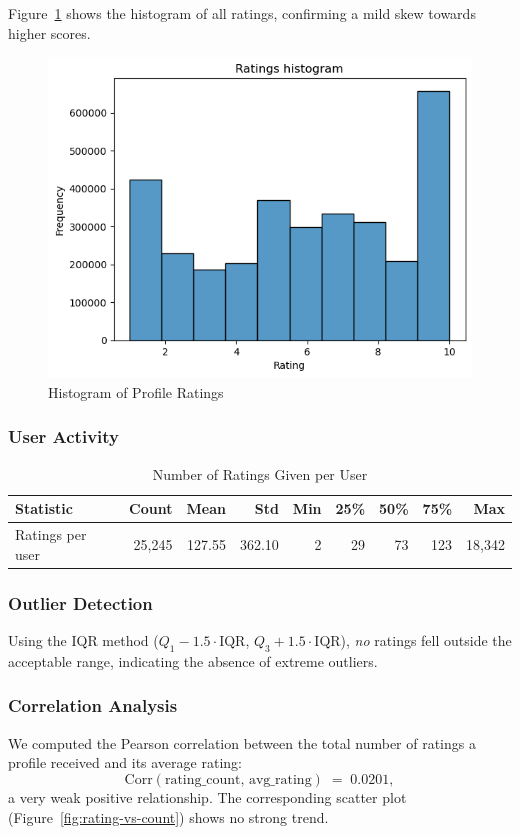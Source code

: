 Figure~\ref{fig:hist-rating} shows the histogram of all ratings, confirming a mild skew towards higher scores.

\begin{figure}[ht!]
  \centering
  \includegraphics[width=0.6\linewidth]{figures/hist.png}
  \caption{Histogram of Profile Ratings}
  \label{fig:hist-rating}
\end{figure}

\subsubsection*{User Activity}
\begin{table}[ht]
    \centering
    \caption{Number of Ratings Given per User}
    \label{tab:user-stats}
    \begin{tabular}{@{}lrrrrrrrr@{}}
    \toprule
    Statistic        & Count    & Mean    & Std     & Min & 25\% & 50\% & 75\%   & Max     \\ 
    \midrule
    Ratings per user & 25{,}245 & 127.55  & 362.10  & 2   & 29   & 73   & 123    & 18{,}342 \\
    \bottomrule
    \end{tabular}
\end{table}


\subsubsection*{Outlier Detection}
Using the IQR method ($Q_1 - 1.5\cdot\mathrm{IQR}$, $Q_3 + 1.5\cdot\mathrm{IQR}$), \emph{no} ratings fell outside the acceptable range, indicating the absence of extreme outliers.

\subsubsection*{Correlation Analysis}
We computed the Pearson correlation between the total number of ratings a profile received and its average rating:
\[
  \mathrm{Corr}(\text{rating\_count},\,\text{avg\_rating})
  \;=\;0.0201,
\]
a very weak positive relationship. The corresponding scatter plot (Figure~\ref{fig:rating-vs-count}) shows no strong trend.

